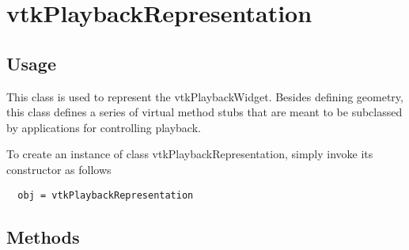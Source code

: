\section{vtkPlaybackRepresentation}

\subsection{Usage}

 This class is used to represent the vtkPlaybackWidget. Besides defining
 geometry, this class defines a series of virtual method stubs that are
 meant to be subclassed by applications for controlling playback.

To create an instance of class vtkPlaybackRepresentation, simply
invoke its constructor as follows
\begin{verbatim}
  obj = vtkPlaybackRepresentation
\end{verbatim}
\subsection{Methods}

